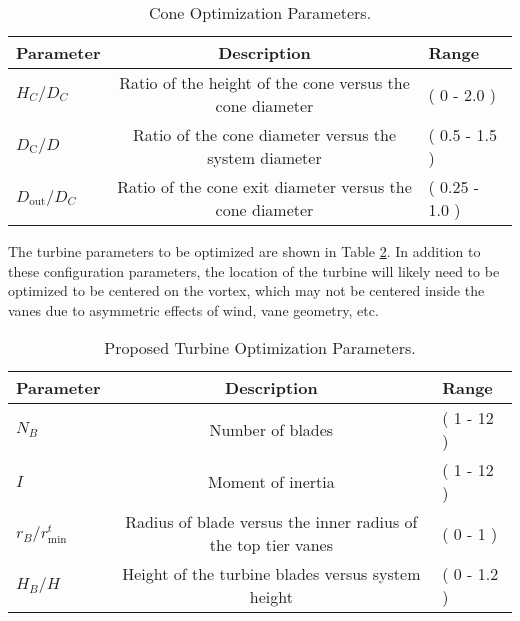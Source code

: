 %
%
\begin{center}
\begin{table}[h]
 \centering
  \begin{tabular}{| l | c | l |}
    \hline
    Parameter & Description & Range \\
    \hline
    $H_C/D_C$ & Ratio of the height of the cone versus the cone diameter & ( 0 - 2.0 ) \\
    $D_{\text{C}}/D$ & Ratio of the cone diameter versus the system
       diameter & ( 0.5 - 1.5 ) \\
    $D_{\text{out}}/D_C$ & Ratio of the cone exit diameter versus the
       cone diameter & ( 0.25 - 1.0 ) \\ 
    \hline
  \end{tabular}
  \caption{Cone Optimization Parameters.}
  \label{tab:cone}
\end{table}
\end{center}

The turbine parameters to be optimized are shown in Table
\ref{tab:turbine}. In addition to these configuration parameters, the
location of the turbine will likely need to be optimized to be centered
on the vortex, which may not be centered inside the vanes due to
asymmetric effects of wind, vane geometry, etc. 

%
%
\begin{center}
\begin{table}[h]
 \centering
  \begin{tabular}{| l | c | l |}
    \hline
    Parameter & Description & Range \\
    \hline
    $N_B$ & Number of blades & ( 1 - 12 ) \\
    $I$ & Moment of inertia & ( 1 - 12 ) \\
    $r_B/r_{\text{min}}^t$ & Radius of blade versus the inner radius of
       the top tier vanes & ( 0 - 1 ) \\
   $H_B/H$ & Height of the turbine blades versus system height & ( 0 - 1.2 ) \\
    \hline
  \end{tabular}
  \caption{Proposed Turbine Optimization Parameters.}
  \label{tab:turbine}
\end{table}
\end{center}

